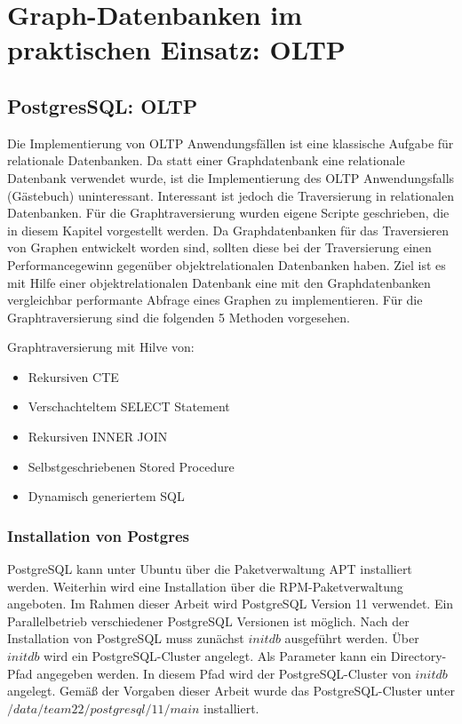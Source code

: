 \chapter{Graph-Datenbanken im praktischen Einsatz: \ac{OLTP}}
\section{PostgresSQL: OLTP}
Die Implementierung von OLTP Anwendungsfällen ist eine klassische Aufgabe für relationale Datenbanken.
Da statt einer Graphdatenbank eine relationale Datenbank verwendet wurde, ist die Implementierung des OLTP Anwendungsfalls (Gästebuch) uninteressant.
Interessant ist jedoch die Traversierung in relationalen Datenbanken.
Für die Graphtraversierung wurden eigene Scripte geschrieben, die in diesem Kapitel vorgestellt werden.
Da Graphdatenbanken für das Traversieren von Graphen entwickelt worden sind, sollten diese bei der Traversierung einen Performancegewinn gegenüber objektrelationalen Datenbanken haben.
Ziel ist es mit Hilfe einer objektrelationalen Datenbank eine mit den Graphdatenbanken vergleichbar performante Abfrage eines Graphen zu implementieren.
Für die Graphtraversierung sind die folgenden 5 Methoden vorgesehen.

Graphtraversierung mit Hilve von:
\begin{itemize}
    \item Rekursiven \ac{CTE}
    \item Verschachteltem SELECT Statement
    \item Rekursiven INNER JOIN
    \item Selbstgeschriebenen Stored Procedure
    \item Dynamisch generiertem \ac{SQL}
\end{itemize}
\subsection{Installation von Postgres}
PostgreSQL kann unter Ubuntu über die Paketverwaltung \ac{APT} installiert werden. Weiterhin wird eine Installation über die \ac{RPM}-Paketverwaltung angeboten. Im Rahmen dieser
Arbeit wird PostgreSQL Version 11 verwendet. Ein Parallelbetrieb verschiedener PostgreSQL Versionen ist möglich. Nach der Installation von PostgreSQL muss zunächst
$initdb$ ausgeführt werden. Über $initdb$ wird ein PostgreSQL-Cluster angelegt. Als Parameter kann ein Directory-Pfad angegeben werden.
In diesem Pfad wird der PostgreSQL-Cluster von $initdb$ angelegt. Gemäß der Vorgaben dieser Arbeit wurde das PostgreSQL-Cluster unter
$/data/team22/postgresql/11/main$ installiert.
